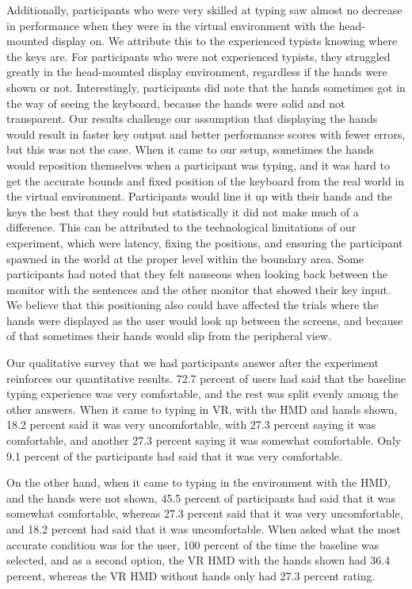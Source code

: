 \documentclass[acmlarge]{acmart}
\begin{document}
Additionally, participants who were very skilled at typing saw almost no decrease in performance when they were in the virtual environment with the head-mounted display on. We attribute this to the experienced typists knowing where the keys are. For participants who were not experienced typists, they struggled greatly in the head-mounted display environment, regardless if the hands were shown or not. 
Interestingly, participants did note that the hands sometimes got in the way of seeing the keyboard, because the hands were solid and not transparent. Our results challenge our assumption that displaying the hands would result in faster key output and better performance scores with fewer errors, but this was not the case. When it came to our setup, sometimes the hands would reposition themselves when a participant was typing, and it was hard to get the accurate bounds and fixed position of the keyboard from the real world in the virtual environment. Participants would line it up with their hands and the keys the best that they could but statistically it did not make much of a difference. This can be attributed to the technological limitations of our experiment, which were latency, fixing the positions, and ensuring the participant spawned in the world at the proper level within the boundary area. Some participants had noted that they felt nauseous when looking back between the monitor with the sentences and the other monitor that showed their key input. We believe that this positioning also could have affected the trials where the hands were displayed as the user would look up between the screens, and because of that sometimes their hands would slip from the peripheral view.  

Our qualitative survey that we had participants answer after the experiment reinforces our quantitative results. 72.7 percent of users had said that the baseline typing experience was very comfortable, and the rest was split evenly among the other answers. When it came to typing in VR, with the HMD and hands shown, 18.2 percent said it was very uncomfortable, with 27.3 percent saying it was comfortable, and another 27.3 percent saying it was somewhat comfortable. Only 9.1 percent of the participants had said that it was very comfortable. 

On the other hand, when it came to typing in the environment with the HMD, and the hands were not shown, 45.5 percent of participants had said that it was somewhat comfortable, whereas 27.3 percent said that it was very uncomfortable, and 18.2 percent had said that it was uncomfortable. When asked what the most accurate condition was for the user, 100 percent of the time the baseline was selected, and as a second option, the VR HMD with the hands shown had 36.4 percent, whereas the VR HMD without hands only had 27.3 percent rating. 
\end{document}
